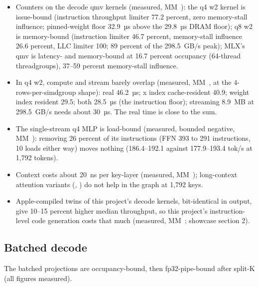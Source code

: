 \begin{itemize}
  Only the head streams at the DRAM peak.
\item Counters on the decode qmv kernels (measured, MM~): the q4 w2 kernel is issue-bound (instruction
  throughput limiter 77.2 percent, zero memory-stall influence; pinned-weight floor 32.9~µs above the 29.8~µs DRAM
  floor); q8 w2 is memory-bound (instruction limiter 46.7 percent, memory-stall influence 26.6 percent, LLC limiter
  100; 89 percent of the 298.5~GB/s peak); MLX's qmv is latency- and memory-bound at 16.7 percent occupancy (64-thread
  threadgroups), 37–59 percent memory-stall influence.
\item In q4 w2, compute and stream barely overlap (measured, MM~, at the 4-rows-per-simdgroup shape): real 46.2~µs; x index cache-resident 40.9;
  weight index resident 29.5; both 28.5~µs (the instruction floor); streaming 8.9~MB at 298.5~GB/s needs about 30~µs.
  The real time is close to the sum.
\item The single-stream q4 MLP is load-bound (measured, bounded negative, MM~): removing 26 percent of its
  instructions (FFN 393 to 291 instructions, 10 loads either way) moves nothing (186.4–192.1 against 177.9–193.4 tok/s
  at 1,792 tokens).
\item Context costs about 20~ns per key-layer (measured, MM~); long-context attention variants (,
  ) do not help in the graph at 1,792 keys.
\item Apple-compiled twins of this project's decode kernels, bit-identical in output, give 10–15 percent higher median
  throughput, so this project's instruction-level code generation costs that much (measured, MM~; showcase
  section 2).
\end{itemize}

\subsection*{Batched decode}

The batched projections are occupancy-bound, then fp32-pipe-bound after split-K (all figures measured).


